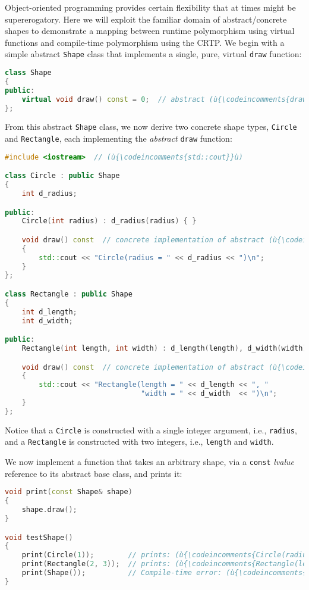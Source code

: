 Object-oriented programming provides certain flexibility that at times
might be supererogatory. Here we will exploit the familiar domain of
abstract/concrete shapes to demonstrate a mapping between runtime
polymorphism using virtual functions and compile-time polymorphism using
the CRTP. We begin with a simple abstract \texttt{Shape} class that
implements a single, pure, virtual \texttt{draw} function:

\begin{lstlisting}[language=C++]
class Shape
{
public:
    virtual void draw() const = 0;  // abstract (ù{\codeincomments{draw}}ù) function (interface)
};
\end{lstlisting}

\noindent From this abstract \texttt{Shape} class, we now derive two concrete
shape types, \texttt{Circle} and \mbox{\texttt{Rectangle}}, each implementing
the \emph{abstract} \texttt{draw} function:

\begin{lstlisting}[language=C++]
#include <iostream>  // (ù{\codeincomments{std::cout}}ù)

class Circle : public Shape
{
    int d_radius;

public:
    Circle(int radius) : d_radius(radius) { }

    void draw() const  // concrete implementation of abstract (ù{\codeincomments{draw}}ù) function
    {
        std::cout << "Circle(radius = " << d_radius << ")\n";
    }
};

class Rectangle : public Shape
{
    int d_length;
    int d_width;

public:
    Rectangle(int length, int width) : d_length(length), d_width(width) { }

    void draw() const  // concrete implementation of abstract (ù{\codeincomments{draw}}ù) function
    {
        std::cout << "Rectangle(length = " << d_length << ", "
                                "width = " << d_width  << ")\n";
    }
};
\end{lstlisting}

\noindent Notice that a \texttt{Circle} is constructed with a single integer
argument, i.e., \texttt{radius}, and a \texttt{Rectangle} is constructed
with two integers, i.e., \texttt{length} and \texttt{width}.

We now implement a function that takes an arbitrary shape, via a
\texttt{const} \emph{lvalue} reference to its abstract base class, and
prints it:

\begin{lstlisting}[language=C++]
void print(const Shape& shape)
{
    shape.draw();
}

void testShape()
{
    print(Circle(1));        // prints: (ù{\codeincomments{Circle(radius = 1)}}ù)
    print(Rectangle(2, 3));  // prints: (ù{\codeincomments{Rectangle(length = 2, width = 3)}}ù)
    print(Shape());          // Compile-time error: (ù{\codeincomments{Shape}}ù) is an abstract class.
}
\end{lstlisting}

